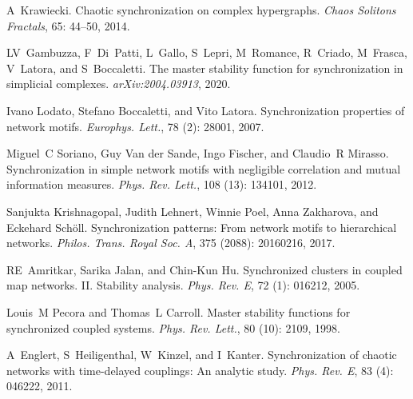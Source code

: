 A~Krawiecki.
\newblock Chaotic synchronization on complex hypergraphs.
\newblock \emph{Chaos Solitons Fractals}, 65: 44--50, 2014.

LV~Gambuzza, F~Di~Patti, L~Gallo, S~Lepri, M~Romance, R~Criado, M~Frasca,
V~Latora, and S~Boccaletti.
\newblock The master stability function for synchronization in simplicial
complexes.
\newblock \emph{arXiv:2004.03913}, 2020.

Ivano Lodato, Stefano Boccaletti, and Vito Latora.
\newblock Synchronization properties of network motifs.
\newblock \emph{Europhys. Lett.}, 78 (2): 28001, 2007.

Miguel~C Soriano, Guy {Van der Sande}, Ingo Fischer, and Claudio~R Mirasso.
\newblock Synchronization in simple network motifs with negligible correlation
and mutual information measures.
\newblock \emph{Phys. Rev. Lett.}, 108 (13): 134101, 2012.

Sanjukta Krishnagopal, Judith Lehnert, Winnie Poel, Anna Zakharova, and
Eckehard Sch{\"o}ll.
\newblock Synchronization patterns: From network motifs to hierarchical
networks.
\newblock \emph{Philos. Trans. Royal Soc. A}, 375 (2088):
20160216, 2017.

RE~Amritkar, Sarika Jalan, and Chin-Kun Hu.
\newblock Synchronized clusters in coupled map networks. {{II}}. {{Stability}}
analysis.
\newblock \emph{Phys. Rev. E}, 72 (1): 016212, 2005.

Louis~M Pecora and Thomas~L Carroll.
\newblock Master stability functions for synchronized coupled systems.
\newblock \emph{Phys. Rev. Lett.}, 80 (10): 2109, 1998.

A~Englert, S~Heiligenthal, W~Kinzel, and I~Kanter.
\newblock Synchronization of chaotic networks with time-delayed couplings:
{{An}} analytic study.
\newblock \emph{Phys. Rev. E}, 83 (4): 046222, 2011.

